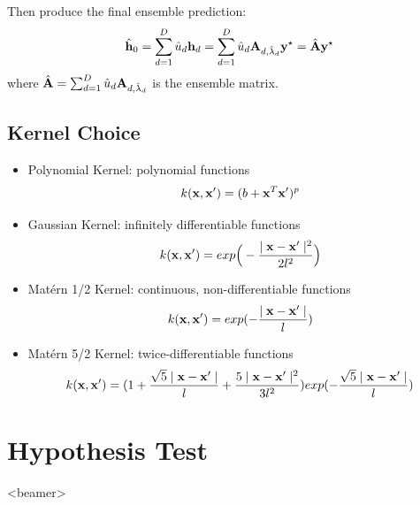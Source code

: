\documentclass{beamer}
\begin{document}
\begin{frame}
Then produce the final ensemble prediction:
\begin{align*}
\hat{{\bf h}}_0=\sum_{d=1}^D \hat{u}_d {\bf h}_d=\sum_{d=1}^D \hat{u}_d {\bf A}_{d,\hat{\lambda}_d}{\bf y}^\star=\hat{{\bf A}}{\bf y}^\star
\end{align*}
where $\hat{{\bf A}}=\sum_{d=1}^D \hat{u}_d {\bf A}_{d,\hat{\lambda}_d}$ is the ensemble matrix.
\end{frame}


\subsection{Kernel Choice}
\begin{frame}
\begin{itemize}
\item Polynomial Kernel: polynomial functions $$k({\bf x}, {\bf x}') = (b + {\bf x}^T{\bf x}')^p$$
\item Gaussian Kernel: infinitely differentiable functions
$$k({\bf x}, {\bf x}') =exp\Big(-\frac{\mid{\bf x}-{\bf x}'\mid^2}{2l^2}\Big)$$
\item Mat\'{e}rn 1/2 Kernel:  continuous, non-differentiable functions $$k({\bf x}, {\bf x}') = exp(-\frac{\mid{\bf x}-{\bf x}'\mid}{l})$$
\item Mat\'{e}rn 5/2 Kernel:  twice-differentiable functions
$$k({\bf x}, {\bf x}') = (1 + \frac{\sqrt{5}\mid{\bf x}-{\bf x}'\mid}{l} +\frac{5\mid{\bf x}-{\bf x}'\mid^2}{3l^2}) exp(-\frac{\sqrt{5}\mid{\bf x}-{\bf x}'\mid}{l})$$
\end{itemize}
\end{frame}


\section{Hypothesis Test}

\begin{frame}<beamer>
\tableofcontents[currentsection]
\end{frame}
\end{document}
